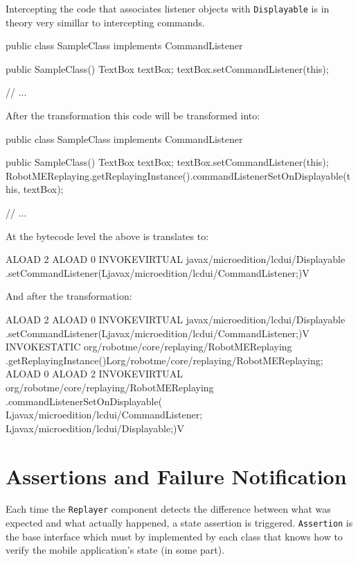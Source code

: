 Intercepting the code that associates listener objects with \texttt{Displayable} is in theory
very simillar to intercepting commands. 

\begin{javablock}
public class SampleClass implements CommandListener {
	public SampleClass() {
		TextBox textBox;
		textBox.setCommandListener(this);
	}

    // ...
}
\end{javablock}

\noindent%
After the transformation this code will be transformed into:

\begin{javablock}
public class SampleClass implements CommandListener {
	public SampleClass() {
		TextBox textBox;
		textBox.setCommandListener(this);
		RobotMEReplaying.getReplayingInstance().commandListenerSetOnDisplayable(this, textBox);
	}

    // ...
}
\end{javablock}

\noindent%
At the bytecode level the above is translates to:

\begin{javablock}
ALOAD 2
ALOAD 0
INVOKEVIRTUAL javax/microedition/lcdui/Displayable
   .setCommandListener(Ljavax/microedition/lcdui/CommandListener;)V
\end{javablock}

\noindent%
And after the transformation:

\begin{javablock}
ALOAD 2
ALOAD 0
INVOKEVIRTUAL javax/microedition/lcdui/Displayable
    .setCommandListener(Ljavax/microedition/lcdui/CommandListener;)V
INVOKESTATIC org/robotme/core/replaying/RobotMEReplaying
    .getReplayingInstance()Lorg/robotme/core/replaying/RobotMEReplaying;
ALOAD 0
ALOAD 2
INVOKEVIRTUAL org/robotme/core/replaying/RobotMEReplaying
    .commandListenerSetOnDisplayable(
        Ljavax/microedition/lcdui/CommandListener;
        Ljavax/microedition/lcdui/Displayable;)V
\end{javablock}


\section{Assertions and Failure Notification}\label{sect:assertionsandfailurenot}

Each time the \texttt{Replayer} component detects the difference between what was expected 
and what actually happened, a state assertion is triggered. \texttt{Assertion} is the base 
interface which must by implemented by each
class that knows how to verify the mobile application's state (in some part).

